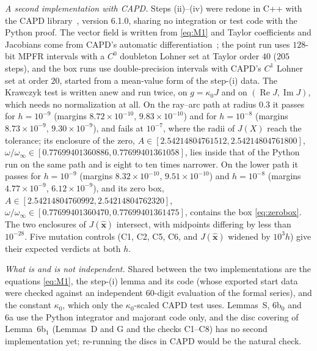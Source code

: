 \documentclass{amsart}
\numberwithin{equation}{section}
\theoremstyle{plain}
\theoremstyle{definition}
\theoremstyle{remark}
\newcommand{\winf}{\omega_\infty}
\newcommand{\re}{\operatorname{Re}}
\newcommand{\im}{\operatorname{Im}}
\newcommand{\hx}{\hat{\mathbf{x}}}
\begin{document}
\emph{A second implementation with CAPD.} Steps (ii)--(iv) were redone in C++ with the CAPD library~\cite{CAPD}, version
6.1.0, sharing no integration or test code with the Python proof. The vector field is written from \eqref{eq:M1} and Taylor
coefficients and Jacobians come from CAPD's automatic differentiation~\cite{Wengert1964}; the point run uses $128$-bit MPFR intervals with a
$C^0$ doubleton Lohner set at Taylor order $40$ ($205$ steps), and the box runs use double-precision intervals with CAPD's $C^1$
Lohner set at order $20$, started from a mean-value form of the step-(i) data. The Krawczyk test is written anew and run twice, on
$g = \kappa_0J$ and on $(\re J, \im J)$, which needs no normalization at all. On the ray--arc path at radius $0.3$ it passes for
$h = 10^{-9}$ (margins $8.72\times10^{-10}$, $9.83\times10^{-10}$) and for $h = 10^{-8}$ (margins $8.73\times10^{-9}$, $9.30\times10^{-9}$), and
fails at $10^{-7}$, where the radii of $J(X)$ reach the tolerance; its enclosure of the zero,
$A \in [2.54214804761512, 2.54214804761800]$, $\omega/\winf \in [0.77699401360886, 0.77699401361058]$, lies inside that of the Python run
on the same path and is eight to ten times narrower. On the lower path it passes for $h = 10^{-9}$ (margins $8.32\times10^{-10}$,
$9.51\times10^{-10}$) and $h = 10^{-8}$ (margins $4.77\times10^{-9}$, $6.12\times10^{-9}$), and its zero box,
$A \in [2.54214804760992, 2.54214804762320]$, $\omega/\winf \in [0.77699401360470, 0.77699401361475]$, contains the box
\eqref{eq:zerobox}. The two enclosures of $J(\hx)$ intersect, with midpoints differing by less than $10^{-28}$. Five mutation
controls (C1, C2, C5, C6, and $J(\hx)$ widened by $10^3h$) give their expected verdicts at both $h$.

\emph{What is and is not independent.} Shared between the two implementations are the equations \eqref{eq:M1}, the step-(i) lemma
and its code (whose exported start data were checked against an independent $60$-digit evaluation of the formal series), and
the constant $\kappa_0$, which only the $\kappa_0$-scaled CAPD test uses. Lemmas~S, 6b$_0$ and 6a use the Python integrator and
majorant code only, and the disc covering of Lemma~6b$_1$ (Lemmas~D and G and the checks C1--C8) has no second implementation
yet; re-running the discs in CAPD would be the natural check.
\end{document}
